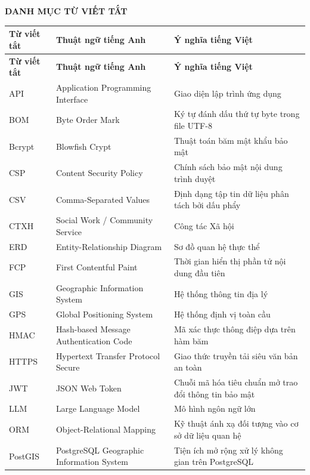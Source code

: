 \begin{center}
    \Large{\textbf{DANH MỤC TỪ VIẾT TẮT}}
\end{center}

\vspace{0.5cm}

\begin{xltabular}{\textwidth}{|l|l|X|}
\hline
\textbf{Từ viết tắt} & \textbf{Thuật ngữ tiếng Anh} & \textbf{Ý nghĩa tiếng Việt} \\ \hline
\endfirsthead
\hline
\textbf{Từ viết tắt} & \textbf{Thuật ngữ tiếng Anh} & \textbf{Ý nghĩa tiếng Việt} \\ \hline
\endhead
\hline
\endfoot
\hline
\endlastfoot
API & Application Programming Interface & Giao diện lập trình ứng dụng \\ \hline
BOM & Byte Order Mark & Ký tự đánh dấu thứ tự byte trong file UTF-8 \\ \hline
Bcrypt & Blowfish Crypt & Thuật toán băm mật khẩu bảo mật \\ \hline
CSP & Content Security Policy & Chính sách bảo mật nội dung trình duyệt \\ \hline
CSV & Comma-Separated Values & Định dạng tập tin dữ liệu phân tách bởi dấu phẩy \\ \hline
CTXH & Social Work / Community Service & Công tác Xã hội \\ \hline
ERD & Entity-Relationship Diagram & Sơ đồ quan hệ thực thể \\ \hline
FCP & First Contentful Paint & Thời gian hiển thị phần tử nội dung đầu tiên \\ \hline
GIS & Geographic Information System & Hệ thống thông tin địa lý \\ \hline
GPS & Global Positioning System & Hệ thống định vị toàn cầu \\ \hline
HMAC & Hash-based Message Authentication Code & Mã xác thực thông điệp dựa trên hàm băm \\ \hline
HTTPS & Hypertext Transfer Protocol Secure & Giao thức truyền tải siêu văn bản an toàn \\ \hline
JWT & JSON Web Token & Chuỗi mã hóa tiêu chuẩn mở trao đổi thông tin bảo mật \\ \hline
LLM & Large Language Model & Mô hình ngôn ngữ lớn \\ \hline
ORM & Object-Relational Mapping & Kỹ thuật ánh xạ đối tượng vào cơ sở dữ liệu quan hệ \\ \hline
PostGIS & PostgreSQL Geographic Information System & Tiện ích mở rộng xử lý không gian trên PostgreSQL \\ \hline

\end{xltabular}
